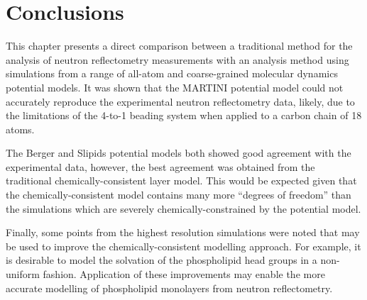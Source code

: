 \section{Conclusions}

This chapter presents a direct comparison between a traditional method for the analysis of neutron reflectometry measurements with an analysis method using simulations from a range of all-atom and coarse-grained molecular dynamics potential models.
It was shown that the MARTINI potential model could not accurately reproduce the experimental neutron reflectometry data, likely, due to the limitations of the 4-to-1 beading system when applied to a carbon chain of 18 atoms.

The Berger and Slipids potential models both showed good agreement with the experimental data, however, the best agreement was obtained from the traditional chemically-consistent layer model.
This would be expected given that the chemically-consistent model contains many more ``degrees of freedom'' than the simulations which are severely chemically-constrained by the potential model.

Finally, some points from the highest resolution simulations were noted that may be used to improve the chemically-consistent modelling approach.
For example, it is desirable to model the solvation of the phospholipid head groups in a non-uniform fashion.
Application of these improvements may enable the more accurate modelling of phospholipid monolayers from neutron reflectometry.
